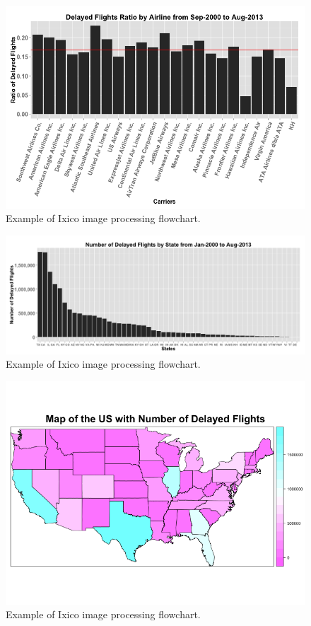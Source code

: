 \documentclass[11pt,twoside,titlepage]{article}
\begin{document}
\begin{figure}[h!]
        \centering
                \includegraphics[width=16cm]{Delayed_by_Airline2.png}
        \caption{Example of Ixico image processing flowchart.}\label{fig:flowchart}
\end{figure}

\begin{figure}[h!]
        \centering
                \includegraphics[width=16cm]{Delays_by_State1.png}
        \caption{Example of Ixico image processing flowchart.}\label{fig:flowchart}
\end{figure}

\begin{figure}[h!]
        \centering
                \includegraphics[width=16cm]{USMap1.png}
        \caption{Example of Ixico image processing flowchart.}\label{fig:flowchart}
\end{figure}
\end{document}
